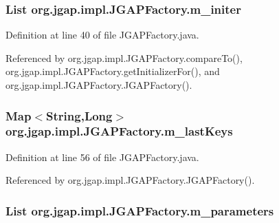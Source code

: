 \hypertarget{classorg_1_1jgap_1_1impl_1_1_j_g_a_p_factory_a123bf40f2b4b228c2d79f1c28dd98dbc}{
\subsubsection[{m\-\_\-initer}]{\setlength{\rightskip}{0pt plus 5cm}List org.\-jgap.\-impl.\-J\-G\-A\-P\-Factory.\-m\-\_\-initer\hspace{0.3cm}{\ttfamily [private]}}}\label{classorg_1_1jgap_1_1impl_1_1_j_g_a_p_factory_a123bf40f2b4b228c2d79f1c28dd98dbc}


Definition at line 40 of file J\-G\-A\-P\-Factory.\-java.



Referenced by org.\-jgap.\-impl.\-J\-G\-A\-P\-Factory.\-compare\-To(), org.\-jgap.\-impl.\-J\-G\-A\-P\-Factory.\-get\-Initializer\-For(), and org.\-jgap.\-impl.\-J\-G\-A\-P\-Factory.\-J\-G\-A\-P\-Factory().

\hypertarget{classorg_1_1jgap_1_1impl_1_1_j_g_a_p_factory_a1ad6ea0257ae0a732bfd367f2dc65b3b}{
\subsubsection[{m\-\_\-last\-Keys}]{\setlength{\rightskip}{0pt plus 5cm}Map$<$String,Long$>$ org.\-jgap.\-impl.\-J\-G\-A\-P\-Factory.\-m\-\_\-last\-Keys\hspace{0.3cm}{\ttfamily [private]}}}\label{classorg_1_1jgap_1_1impl_1_1_j_g_a_p_factory_a1ad6ea0257ae0a732bfd367f2dc65b3b}


Definition at line 56 of file J\-G\-A\-P\-Factory.\-java.



Referenced by org.\-jgap.\-impl.\-J\-G\-A\-P\-Factory.\-J\-G\-A\-P\-Factory().

\hypertarget{classorg_1_1jgap_1_1impl_1_1_j_g_a_p_factory_a52a35147b7ec2d03ed2a3597dc1aa9c2}{
\subsubsection[{m\-\_\-parameters}]{\setlength{\rightskip}{0pt plus 5cm}List org.\-jgap.\-impl.\-J\-G\-A\-P\-Factory.\-m\-\_\-parameters\hspace{0.3cm}{\ttfamily [private]}}}\label{classorg_1_1jgap_1_1impl_1_1_j_g_a_p_factory_a52a35147b7ec2d03ed2a3597dc1aa9c2}


